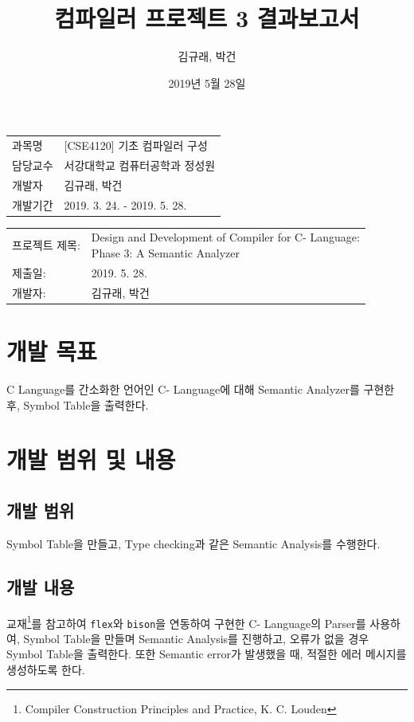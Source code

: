 \documentclass[a4paper, 10pt]{oblivoir}
\title{컴파일러 프로젝트 3 결과보고서}
\author{김규래, 박건}
\date{2019년 5월 28일}
\begin{document}
\maketitle

\vspace*{\fill}

\begin{center}
\begin{tabular}{ l l }
과목명 & [CSE4120] 기초 컴파일러 구성 \\
담당교수 & 서강대학교 컴퓨터공학과 정성원 \\
개발자 & 김규래, 박건 \\
개발기간 & 2019. 3. 24. - 2019. 5. 28. \\
\end{tabular}
\end{center}

\vspace*{\fill}

\pagebreak

\begin{tabular}{ l l }
프로젝트 제목: & \makecell{Design and Development of Compiler for C- Language: \\
Phase 3: A Semantic Analyzer} \\
제출일: & 2019. 5. 28.\\
개발자: & 김규래, 박건 \\
\end{tabular}

\section{개발 목표}
C Language를 간소화한 언어인 C- Language에 대해 Semantic Analyzer를 구현한 후, Symbol Table을 출력한다.

\section{개발 범위 및 내용}
\subsection{개발 범위}
Symbol Table을 만들고, Type checking과 같은 Semantic Analysis를 수행한다.

\subsection{개발 내용}
교재\footnote{Compiler Construction Principles and Practice, K. C. Louden}를 참고하여 \texttt{flex}와 \texttt{bison}을 연동하여 구현한 C- Language의 Parser를 사용하여, Symbol Table을 만들며 Semantic Analysis를 진행하고, 오류가 없을 경우 Symbol Table을 출력한다. 또한 Semantic error가 발생했을 때, 적절한 에러 메시지를 생성하도록 한다.
\end{document}
